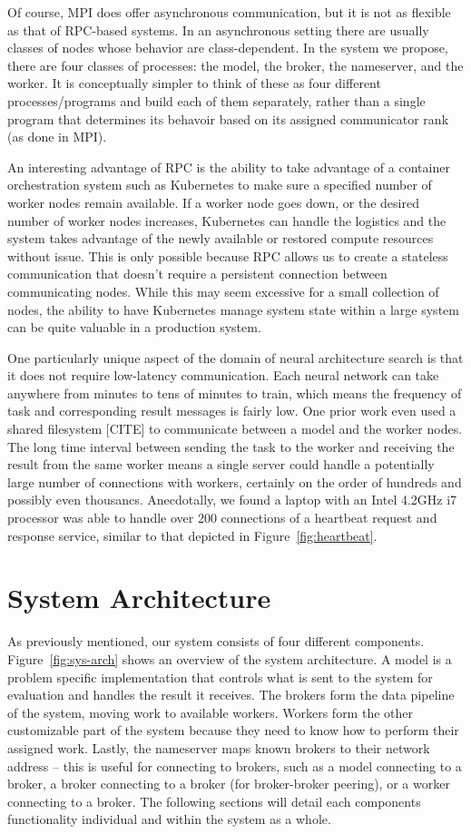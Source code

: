 \documentclass[conference]{IEEEtran}
\begin{document}
Of course,
MPI does offer asynchronous communication, but it is not as flexible as that of
RPC-based systems. In an asynchronous setting there are usually classes of nodes
whose behavior are class-dependent. In the system we propose, there are four
classes of processes: the model, the broker, the nameserver, and the worker. It
is conceptually simpler to think of these as four different processes/programs
and build each of them separately, rather than a single program that determines
its behavoir based on its assigned communicator rank (as done in MPI).

An interesting advantage of RPC is the ability to take advantage of a container
orchestration system such as Kubernetes \cite{43826} to make sure a specified
number of worker nodes remain available. If a worker node goes down, or the
desired number of worker nodes increases, Kubernetes can handle the logistics
and the system takes advantage of the newly available or restored compute
resources without issue. This is only possible because RPC allows us to
create a stateless communication that doesn't require a persistent connection
between communicating nodes. While this may seem excessive for a small collection
of nodes, the ability to have Kubernetes manage system state within a large
system can be quite valuable in a production system.

One particularly unique aspect of the domain of neural architecture search is
that it does not require low-latency communication. Each neural network can
take anywhere from minutes to tens of minutes to train, which means the
frequency of task and corresponding result messages is fairly low. One prior
work even used a shared filesystem [CITE] to communicate between a model and the
worker nodes. The long time interval between sending the task to the worker
and receiving the result from the same worker means a single server could
handle a potentially large number of connections with workers, certainly
on the order of hundreds and possibly even thousancs. Anecdotally, we found
a laptop with an Intel 4.2GHz i7 processor was able to handle over 200
connections of a heartbeat request and response service, similar to that
depicted in Figure~\ref{fig:heartbeat}.

\section{System Architecture}
As previously mentioned, our system consists of four different components.
Figure~\ref{fig:sys-arch} shows an overview of the system architecture.  A model
is a problem specific implementation that controls what is sent to the system
for evaluation and handles the result it receives. The brokers form the data
pipeline of the system, moving work to available workers. Workers form the other
customizable part of the system because they need to know how to perform their
assigned work.  Lastly, the nameserver maps known brokers to their network
address -- this is useful for connecting to brokers, such as a model connecting
to a broker, a broker connecting to a broker (for broker-broker peering), or a
worker connecting to a broker. The following sections will detail each
components functionality individual and within the system as a whole.
\end{document}
